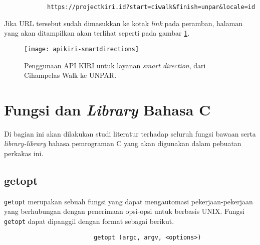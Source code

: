 \begin{verbatim}
            https://projectkiri.id?start=ciwalk&finish=unpar&locale=id
\end{verbatim}
\noindent
Jika URL tersebut sudah dimasukkan ke kotak \textit{link} pada peramban, halaman yang akan ditampilkan akan terlihat seperti pada gambar \ref{fig:kiri-api-smartdirections-usage}.

\begin{figure}[ht]
    \centering
    \texttt{[image: apikiri-smartdirections]}
    \caption[Penggunaan API KIRI untuk layanan \textit{smart direction}]{Penggunaan API KIRI untuk layanan \textit{smart direction}, dari Cihampelas Walk ke UNPAR.}
    \label{fig:kiri-api-smartdirections-usage}
\end{figure}

\section{Fungsi dan \textit{Library} Bahasa C}
\label{sec:cmodules}

Di bagian ini akan dilakukan studi literatur terhadap seluruh fungsi bawaan serta \textit{library-library} bahasa pemrograman C yang akan digunakan dalam pebuatan perkakas ini.

\subsection{getopt \cite{loosemore:2022:gnuclibrary}}
\label{sec:cmodules-getopt}

\verb|getopt| merupakan sebuah fungsi yang dapat mengautomasi pekerjaan-pekerjaan yang berhubungan dengan penerimaan opsi-opsi untuk \cl berbasis UNIX.
\newline\newline\noindent
Fungsi \verb|getopt| dapat dipanggil dengan format sebagai berikut.

\begin{verbatim}
                         getopt (argc, argv, <options>)
\end{verbatim}

